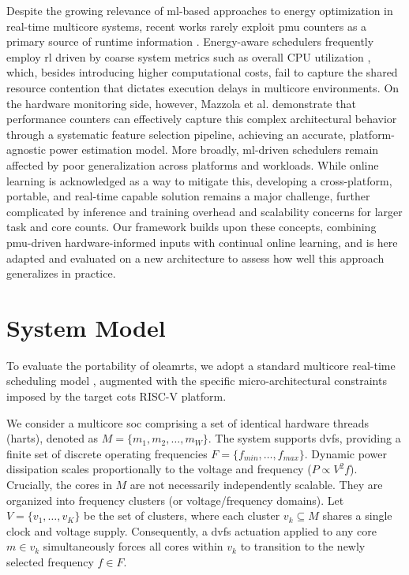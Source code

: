 \documentclass[journal]{IEEEtran}
\begin{document}
Despite the growing relevance of \gls{ml}-based approaches to energy optimization in real-time multicore systems, recent works rarely exploit \gls{pmu} counters as a primary source of runtime information \cite{rahim2025survey}. Energy-aware schedulers frequently employ \gls{rl} driven by coarse system metrics such as overall CPU utilization \cite{li2025energy, uddin2023dynamic}, which, besides introducing higher computational costs, fail to capture the shared resource contention that dictates execution delays in multicore environments. On the hardware monitoring side, however, Mazzola et al. \cite{mazzola2022data} demonstrate that performance counters can effectively capture this complex architectural behavior through a systematic feature selection pipeline, achieving an accurate, platform-agnostic power estimation model. More broadly, \gls{ml}-driven schedulers remain affected by poor generalization across platforms and workloads. While online learning is acknowledged as a way to mitigate this, developing a cross-platform, portable, and real-time capable solution remains a major challenge, further complicated by inference and training overhead and scalability concerns for larger task and core counts. Our framework builds upon these concepts, combining \gls{pmu}-driven hardware-informed inputs with continual online learning, and is here adapted and evaluated on a new architecture to assess how well this approach generalizes in practice.

\section{System Model} \label{sec:system_model}

To evaluate the portability of \gls{oleamrts}, we adopt a standard multicore real-time scheduling model \cite{ul2018task}, augmented with the specific micro-architectural constraints imposed by the target \gls{cots} RISC-V platform.

We consider a multicore \gls{soc} comprising a set of identical hardware threads (harts), denoted as $M = \{m_1, m_2, \dots, m_W\}$. The system supports \gls{dvfs}, providing a finite set of discrete operating frequencies ${F = \{f_{min}, \dots, f_{max}\}}$. Dynamic power dissipation scales proportionally to the voltage and frequency ($P \propto V^2f$). Crucially, the cores in $M$ are not necessarily independently scalable. They are organized into frequency clusters (or voltage/frequency domains). Let $V = \{v_1, \dots, v_K\}$ be the set of clusters, where each cluster $v_k \subseteq M$ shares a single clock and voltage supply. Consequently, a \gls{dvfs} actuation applied to any core $m \in v_k$ simultaneously forces all cores within $v_k$ to transition to the newly selected frequency $f \in F$.
\end{document}
